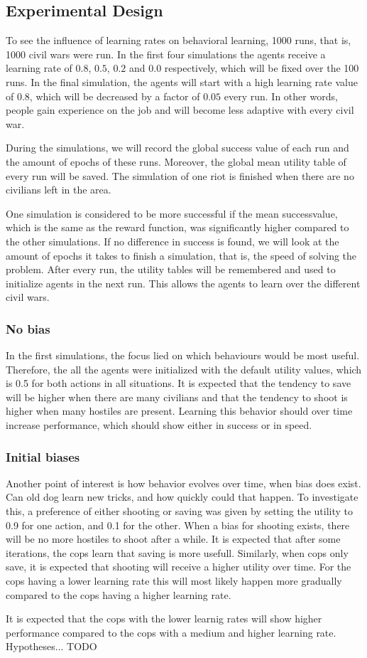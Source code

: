 \subsection{Experimental Design}
To see the influence of learning rates on behavioral learning, 1000 runs, that is, 1000 civil wars were run. In the first four simulations the agents receive a learning rate of $0.8$, $0.5$, $0.2$ and $0.0$ respectively, which will be fixed over the 100 runs. In the final simulation, the agents will start with a high learning rate value of $0.8$, which will be decreased by a factor of $0.05$ every run. In other words, people gain experience on the job and will become less adaptive with every civil war. 

During the simulations, we will record the global success value of each run and the amount of epochs of these runs. Moreover, the global mean utility table of every run will be saved. The simulation of one riot is finished when there are no civilians left in the area. 

One simulation is considered to be more successful if the mean successvalue, which is the same as the reward function, was significantly higher compared to the other simulations. If no difference in success is found, we will look at the amount of epochs it takes to finish a simulation, that is, the speed of solving the problem. After every run, the utility tables will be remembered and used to initialize agents in the next run. This allows the agents to learn over the different civil wars. 

\subsubsection{No bias}
In the first simulations, the focus lied on which behaviours would be most useful. Therefore, the all the agents were initialized with the default utility values, which is 0.5 for both actions in all situations. It is expected that the tendency to save will be higher when there are many civilians and that the tendency to shoot is higher when many hostiles are present. Learning this behavior should over time increase performance, which should show either in success or in speed. 

\subsubsection{Initial biases}
Another point of interest is how behavior evolves over time, when bias does exist. Can old dog learn new tricks, and how quickly could that happen. To investigate this, a preference of either shooting or saving was given by setting the utility to 0.9 for one action, and 0.1 for the other. When a bias for shooting exists, there will be no more hostiles to shoot after a while. It is expected that after some iterations, the cops learn that saving is more usefull. Similarly, when cops only save, it is expected that shooting will receive a higher utility over time. For the cops having a lower learning rate this will most likely happen more gradually compared to the cops having a higher learning rate.

It is expected that the cops with the lower learnig rates will show higher performance compared to the cops with a medium and higher learning rate. Hypotheses... TODO